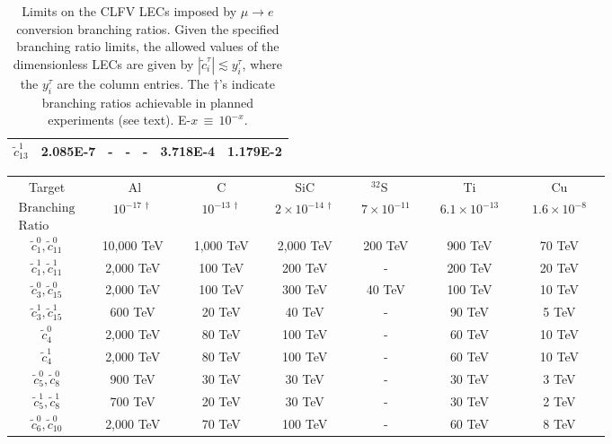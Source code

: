 \documentclass{book}[letterpaper,12pt]
\begin{document}
\begin{table}
{\begin{tabular}{ccccccc}
$\tilde{c}_{13}^1$ & 2.085E-7 & - & - & - & 3.718E-4 & 1.179E-2 \\[2.6pt]
\hline
\hline
\end{tabular}
}
\caption{Limits on the CLFV LECs imposed by $\mu \rightarrow e$ conversion branching ratios. 
Given the specified branching ratio limits, the allowed values of the dimensionless LECs are 
given by $|\tilde{c}_i^\tau| \lesssim y_i^\tau$, where the $y_i^\tau$ are the column entries.  The $\dagger$'s indicate  
branching ratios achievable in planned experiments (see text).   E-$x \, \equiv \,10^{-x}.$ \cite{BADERTSCHER1982406} \cite{wintz} \cite{PhysRevLett.28.1469}}
\label{tab:LEC_limits}
\end{table} 

\begin{table}
\centering
{\renewcommand{\arraystretch}{1.5}
\begin{tabular}{ccccccc}
\hline
\hline
Target  &~~~~~ Al~~~~~&~~~~~C~~~~~&~~~~SiC~~~~&~~~$^{32}$S~~~~~&~~~~~Ti~~~~~&~~~~~Cu~~~~~ \\[1.6pt]
$\begin{array}{l} \mathrm{Branching} \\  \mathrm{Ratio} \end{array}$ & $10^{-17 \, \dagger}$ & $10^{-13 \, \dagger}$ & $2 \times 10^{-14 \, \dagger}$ & $7 \times 10^{-11}$ &  $6.1 \times 10^{-13}$  & $1.6 \times 10^{-8}$ \\
\hline
\hline
$\tilde{c}_1^0,\tilde{c}_{11}^0$ &  10,000 TeV & 1,000 TeV & 2,000 TeV & 200 TeV & 900 TeV & 70 TeV\\
$\tilde{c}_1^1,\tilde{c}_{11}^1$ & 2,000 TeV & 100 TeV & 200 TeV & - & 200 TeV & 20 TeV\\
$\tilde{c}_3^0,\tilde{c}_{15}^0$ & 2,000 TeV & 100 TeV & 300 TeV & 40 TeV & 100 TeV & 10 TeV\\
$\tilde{c}_3^1,\tilde{c}_{15}^1$ & 600 TeV & 20 TeV & 40 TeV & - & 90 TeV & 5 TeV\\
$\tilde{c}_4^0$ & 2,000 TeV & 80 TeV & 100 TeV & - & 60 TeV & 10 TeV\\
$\tilde{c}_4^1$ & 2,000 TeV & 80 TeV & 100 TeV & - & 60 TeV & 10 TeV\\
$\tilde{c}_5^0,\tilde{c}_8^0$ & 900 TeV & 30 TeV & 30 TeV & - & 30 TeV & 3 TeV\\
$\tilde{c}_5^1,\tilde{c}_8^1$ & 700 TeV & 20 TeV & 30 TeV & - & 30 TeV & 2 TeV\\
$\tilde{c}_6^0,\tilde{c}_{10}^0$ & 2,000 TeV & 70 TeV & 100 TeV & - & 60 TeV & 8 TeV\\

\end{tabular}}
\end{table}
\end{document}
